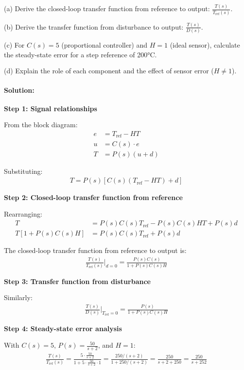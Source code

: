 \documentclass[11pt,a4paper]{article}
\begin{document}
(a) Derive the closed-loop transfer function from reference to output: $\frac{T(s)}{T_{\text{ref}}(s)}$.

(b) Derive the transfer function from disturbance to output: $\frac{T(s)}{D(s)}$.

(c) For $C(s) = 5$ (proportional controller) and $H = 1$ (ideal sensor), calculate the steady-state error for a step reference of 200°C.

(d) Explain the role of each component and the effect of sensor error ($H \neq 1$).

\paragraph{Solution:}

\textbf{Step 1: Signal relationships}

From the block diagram:
\begin{align}
e &= T_{\text{ref}} - HT \\
u &= C(s) \cdot e \\
T &= P(s)(u + d)
\end{align}

Substituting:
\begin{align}
T = P(s)[C(s)(T_{\text{ref}} - HT) + d]
\end{align}

\textbf{Step 2: Closed-loop transfer function from reference}

Rearranging:
\begin{align}
T &= P(s)C(s)T_{\text{ref}} - P(s)C(s)HT + P(s)d \\
T[1 + P(s)C(s)H] &= P(s)C(s)T_{\text{ref}} + P(s)d
\end{align}

The closed-loop transfer function from reference to output is:
\begin{align}
\frac{T(s)}{T_{\text{ref}}(s)}\bigg|_{d=0} = \frac{P(s)C(s)}{1 + P(s)C(s)H}
\end{align}

\textbf{Step 3: Transfer function from disturbance}

Similarly:
\begin{align}
\frac{T(s)}{D(s)}\bigg|_{T_{\text{ref}}=0} = \frac{P(s)}{1 + P(s)C(s)H}
\end{align}

\textbf{Step 4: Steady-state error analysis}

With $C(s) = 5$, $P(s) = \frac{50}{s+2}$, and $H = 1$:
\begin{align}
\frac{T(s)}{T_{\text{ref}}(s)} = \frac{5 \cdot \frac{50}{s+2}}{1 + 5 \cdot \frac{50}{s+2} \cdot 1} = \frac{250/(s+2)}{1 + 250/(s+2)} = \frac{250}{s+2+250} = \frac{250}{s+252}
\end{align}
\end{document}
